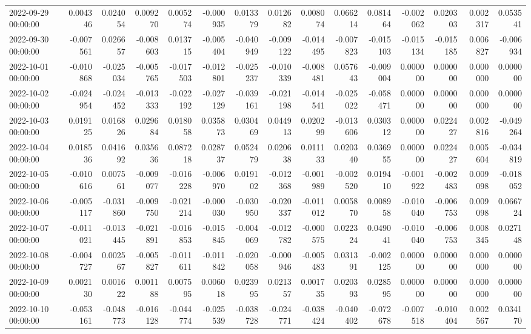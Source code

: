 \begin{tabular}{lrrrrrrrrrrrrrr}
2022-09-29 00:00:00 & 0.004346 & 0.024054 & 0.009270 & 0.005274 & -0.000935 & 0.013379 & 0.012682 & 0.008074 & 0.066214 & 0.081464 & -0.002062 & 0.020303 & 0.002317 & 0.053541 \\
2022-09-30 00:00:00 & -0.007561 & 0.026657 & -0.008603 & 0.013715 & -0.005404 & -0.040949 & -0.009122 & -0.014495 & -0.007823 & -0.015103 & -0.015134 & -0.015185 & 0.006827 & -0.006934 \\
2022-10-01 00:00:00 & -0.010868 & -0.025034 & -0.005765 & -0.017503 & -0.012801 & -0.025237 & -0.010339 & -0.008481 & 0.057643 & -0.009004 & 0.000000 & 0.000000 & 0.000000 & 0.000000 \\
2022-10-02 00:00:00 & -0.024954 & -0.024452 & -0.013333 & -0.022192 & -0.027129 & -0.039161 & -0.021198 & -0.014541 & -0.025022 & -0.058471 & 0.000000 & 0.000000 & 0.000000 & 0.000000 \\
2022-10-03 00:00:00 & 0.019125 & 0.016826 & 0.029684 & 0.018058 & 0.035873 & 0.030469 & 0.044913 & 0.020299 & -0.013606 & 0.030312 & 0.000000 & 0.022427 & 0.002816 & -0.049264 \\
2022-10-04 00:00:00 & 0.018536 & 0.041692 & 0.035636 & 0.087218 & 0.028737 & 0.052479 & 0.020638 & 0.011133 & 0.020340 & 0.036955 & 0.000000 & 0.022427 & 0.005604 & -0.034819 \\
2022-10-05 00:00:00 & -0.010616 & 0.007561 & -0.009077 & -0.016228 & -0.006970 & 0.019102 & -0.012368 & -0.001989 & -0.002520 & 0.019410 & -0.001922 & -0.002483 & 0.009098 & -0.018052 \\
2022-10-06 00:00:00 & -0.005117 & -0.031860 & -0.009750 & -0.021214 & -0.000030 & -0.030950 & -0.020337 & -0.011012 & 0.005870 & 0.008958 & -0.010040 & -0.006753 & 0.009098 & 0.066724 \\
2022-10-07 00:00:00 & -0.011021 & -0.013445 & -0.021891 & -0.016853 & -0.015845 & -0.004069 & -0.012782 & -0.000575 & 0.022324 & 0.049041 & -0.010040 & -0.006753 & 0.008345 & 0.027148 \\
2022-10-08 00:00:00 & -0.004727 & 0.002567 & -0.005827 & -0.011611 & -0.011842 & -0.020058 & -0.000946 & -0.005483 & 0.031391 & -0.002125 & 0.000000 & 0.000000 & 0.000000 & 0.000000 \\
2022-10-09 00:00:00 & 0.002130 & 0.001622 & 0.001188 & 0.007595 & 0.006018 & 0.023995 & 0.021357 & 0.001735 & 0.020393 & 0.028595 & 0.000000 & 0.000000 & 0.000000 & 0.000000 \\
2022-10-10 00:00:00 & -0.053161 & -0.048773 & -0.016128 & -0.044774 & -0.025539 & -0.038728 & -0.024771 & -0.038424 & -0.040402 & -0.072678 & -0.007518 & -0.010404 & 0.002567 & 0.034170 \\

\end{tabular}
